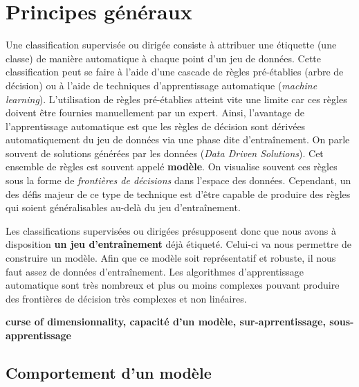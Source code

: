 \documentclass[
  11pt,
  letterpaper,
  open=any,
  twoside=false,
  french]{scrbook}
\begin{document}
\section{Principes généraux}\label{principes-guxe9nuxe9raux}

Une classification supervisée ou dirigée consiste à attribuer une
étiquette (une classe) de manière automatique à chaque point d'un jeu de
données. Cette classification peut se faire à l'aide d'une cascade de
règles pré-établies (arbre de décision) ou à l'aide de techniques
d'apprentissage automatique (\emph{machine learning}). L'utilisation de
règles pré-établies atteint vite une limite car ces règles doivent être
fournies manuellement par un expert. Ainsi, l'avantage de
l'apprentissage automatique est que les règles de décision sont dérivées
automatiquement du jeu de données via une phase dite d'entraînement. On
parle souvent de solutions générées par les données (\emph{Data Driven
Solutions}). Cet ensemble de règles est souvent appelé \textbf{modèle}.
On visualise souvent ces règles sous la forme de \emph{frontières de
décisions} dans l'espace des données. Cependant, un des défis majeur de
ce type de technique est d'être capable de produire des règles qui
soient généralisables au-delà du jeu d'entraînement.

Les classifications supervisées ou dirigées présupposent donc que nous
avons à disposition \textbf{un jeu d'entraînement} déjà étiqueté.
Celui-ci va nous permettre de construire un modèle. Afin que ce modèle
soit représentatif et robuste, il nous faut assez de données
d'entraînement. Les algorithmes d'apprentissage automatique sont très
nombreux et plus ou moins complexes pouvant produire des frontières de
décision très complexes et non linéaires.

\textbf{curse of dimensionnality, capacité d'un modèle,
sur-aprrentissage, sous-apprentissage}

\subsection{Comportement d'un modèle}\label{comportement-dun-moduxe8le}
\end{document}
